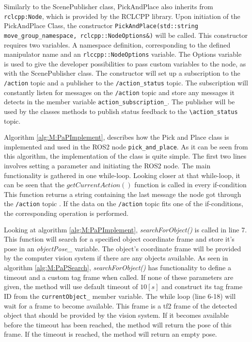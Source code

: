 Similarly to the ScenePublisher class, PickAndPlace also inherits from \lstinline{rclcpp:Node}, which is provided by the RCLCPP library. Upon initiation of the PickAndPlace Class, the constructor \lstinline{PickAndPlace(std::string move_group_namespace, rclcpp::NodeOptions&)} will be called. This constructor requires two variables. A namespace definition, corresponding to the defined manipulator name and an \lstinline{rlccpp::NodeOptions} variable. The Options variable is used to give the developer possibilities to pass custom variables to the node, as with the ScenePublisher class.
The constructor will set up a subscription to the \lstinline{/action} topic and a publisher to the \lstinline{/action_status} topic. The subscription will constantly listen for messages on the \lstinline{/action} topic and store any messages it detects in the member variable \lstinline{action_subscription_}. The publisher will be used by the classes methods to publish status feedback to the \lstinline{\action_status} topic.

Algorithm \ref{alg:M:PaPImplement}, 
describes how the Pick and Place class is implemented and used in the ROS2 node \lstinline{pick_and_place}. As it can be seen from this algorithm, the implementation of the class is quite simple. The first two lines involves setting a parameter and initiating the ROS2 node. The main functionality is gathered in one while-loop. Looking closer at that while-loop, it can be seen that the $getCurrentAction()$ function is called in every if-condition This function  returns a string containing the last message the node got through the \lstinline{/action} topic . If the data on the \lstinline{/action} topic fits one of the if-conditions, the corresponding operation is performed.


Looking at algorithm \ref{alg:M:PaPImplement}, \textit{searchForObject()} is called in line 7. This function will search for a specified object coordinate frame and store it's pose in an \textit{objectPose\_} variable. The object's coordinate frame will be provided by the computer vision system if there are any objects available. As seen in algorithm \ref{alg:M:PaPSearch}, \textit{searchForObject()} has functionality to define a timeout and a custom tag frame when called. If none of these parameters are given, the method will use default timeout of $10[s]$ and construct its tag frame ID from the \lstinline{currentObject_} member variable. The while loop (line 6-18) will wait for a frame to become available. This frame is a tf2 frame of the detected object that should be provided by the vision system. If it becomes available before the timeout has been reached, the method will return the pose of this frame. If the timeout is reached, the method will return an empty pose.

